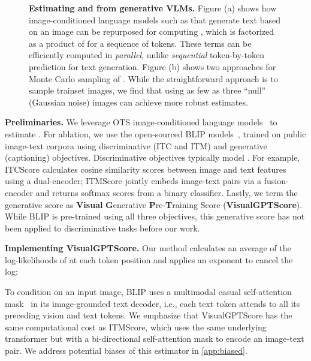 \documentclass{article} \usepackage{iclr2024_conference,times}
\begin{document}
\begin{figure*}[t]
  \centering
  \caption{\small {\bf Estimating  and  from generative VLMs.} Figure (a) shows how image-conditioned language models such as \citet{blip} that generate text based on an image can be repurposed for computing , which is factorized as a product of  for a sequence of  tokens. These terms can be efficiently computed in {\em parallel}, unlike {\em sequential} token-by-token prediction for text generation. Figure (b) shows two approaches for Monte Carlo sampling of . While the straightforward approach is to sample trainset images, we find that using as few as three ``null'' (Gaussian noise) images can achieve more robust estimates.}
\label{fig:visual_gpt_score}
\end{figure*}

{\bf Preliminaries.} We leverage OTS image-conditioned language models~\citep{yu2022coca, flamingo, blip2} to estimate . For ablation, we use the open-sourced BLIP models~\citep{blip}, trained on public image-text corpora using discriminative (ITC and ITM) and generative (captioning) objectives. Discriminative objectives typically model . For example, ITCScore calculates cosine similarity scores between image and text features using a dual-encoder; ITMScore jointly embeds image-text pairs via a fusion-encoder and returns softmax scores from a binary classifier. Lastly, we term the generative score as {\bf Visual} {\bf G}enerative {\bf P}re-{\bf T}raining Score ({\bf VisualGPTScore}). While BLIP is pre-trained using all three objectives, this generative score has not been applied to discriminative tasks before our work.



{\bf Implementing VisualGPTScore.} Our method calculates an average of the log-likelihoods of  at each token position  and applies an exponent to cancel the log:

To condition on an input image, BLIP uses a multimodal casual self-attention mask~\citep{blip} in its image-grounded text decoder, i.e., each text token attends to all its preceding vision and text tokens. We emphasize that VisualGPTScore has the same computational cost as ITMScore, which uses the same underlying transformer but with a bi-directional self-attention mask to encode an image-text pair. We address potential biases of this estimator in \autoref{app:biased}.
\end{document}
